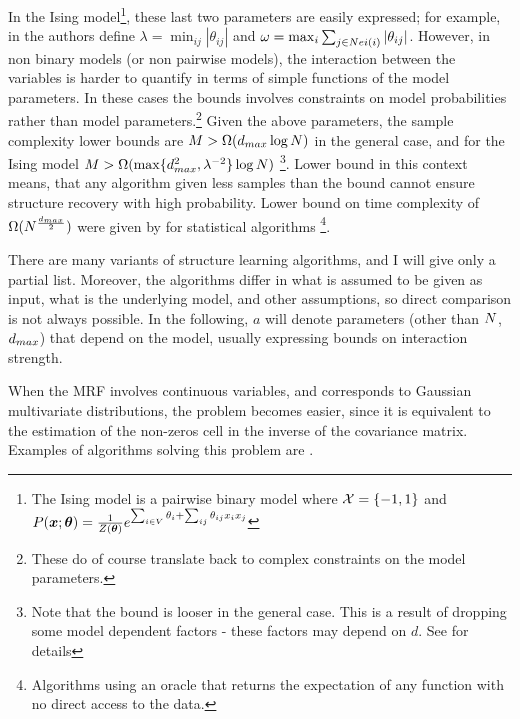 In the Ising model\footnote{The Ising model is a pairwise binary model where ${\cal X} = \{-1,1\}$ and $P(\boldsymbol{x};\boldsymbol{\theta}) = \frac{1}{Z(\boldsymbol{\theta})} e^{\sum_{i \in V}\theta_i + \sum_{ij}\theta_{ij}x_ix_j}$}, these last two parameters are easily expressed; for example, in \cite{santhanam2012information} the authors define $\lambda =
\min_{ij} |\theta_{ij}|$ and $\omega = \max_i \sum_{j \in Nei(i)} |\theta_{ij}|$.
However, in non binary models (or non pairwise models), the interaction between the variables is harder to quantify in terms of simple functions of the model parameters. In these cases the bounds involves constraints on model probabilities rather than model parameters.\footnote{These do of course translate back 
to complex constraints on the model parameters.}
Given the above parameters, the sample complexity lower bounds are $M > \Omega(d_{max} \log N)$ \cite{bresler2008reconstruction} in the general case, and for the Ising model $M > \Omega(\max\{d_{max}^2, \lambda^{-2}\}\log N)$ \cite{santhanam2012information}\footnote{Note that the bound is looser in the general case. This is a result of dropping some model dependent factors - these factors may depend on $d$. See \cite{bresler2008reconstruction} for details}.
Lower bound in this context means, that any algorithm given less samples than the bound cannot ensure structure recovery with high probability.
Lower bound on time complexity of $\Omega(N^{\frac{d_{max}}{2}})$ were given by \cite{bresler2014structure} for statistical algorithms \cite{feldman2013statistical}\footnote{Algorithms using an oracle that returns the expectation of any function with no direct access to the data.}.

There are many variants of structure learning algorithms, and I will give only a partial list. Moreover, the algorithms differ in what is assumed to be given as input, what is the underlying model, and other assumptions, so direct comparison is not always possible. In the following, $a$ will denote parameters (other than $N$, $d_{max}$) that depend on the model, usually expressing bounds on interaction strength.

When the MRF involves continuous variables, and corresponds to Gaussian multivariate distributions, the problem becomes easier, since it is equivalent to the estimation of the non-zeros cell in the inverse of the covariance matrix. Examples of algorithms solving this problem are \cite{meinshausen2006high, yuan2007model, friedman2008sparse}. 

